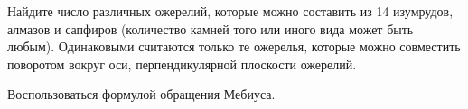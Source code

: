 \begin{comment}
\begin{problem}[``сто заключенных'']
В коридоре находятся 100 человек, у каждого свой номер (от 1 до 100). Их по одному заводят в комнату, в которой 
находится комод со 100 выдвижными ящиками. В ящики случайным образом 
разложены карточки с номерами (от 1 до 100). Каждому разрешается заглянуть в 
не более чем 50 ящиков. Цель каждого -- определить, в каком ящике находится 
его номер. Общаться и передавать друг другу информацию запрещается. 
Предложите стратегию, которая с вероятностью не меньшей $0.3$ (в 
предположении, что все $100!$ способов распределения карточек по ящикам 
равновероятны) приведет к выигрышу всей команды. Команда выигрывает, если 
все 100 участников верно определили ящик с карточкой своего номера.
\end{problem}

\textbf{Стратегия. }Каждый человек первым открывает ящик под его номером, 
вторым -- под номером, который указан на карточке, лежащей в ящике, открытом 
перед этим и т.д. Среднее число циклов длины r в случайной 
перестановке -- есть 1/r (покажите, используя, например, задачу ``про 
предельные меры''). Тогда среднее число циклов длины большей n/2 
есть $\sum\limits_{i=n \mathord{\left/ {\vphantom {n 2}} \right. 
\kern-\nulldelimiterspace} 2}^n {\frac{1}{i}} $. Это и есть вероятность 
существования цикла длины большей n/2. Поэтому вероятность успеха команды -- 
есть $1-\sum\limits_{i=51}^{100} {\frac{1}{i}} \approx 0,31$. Если 
же просто произвольно открывать ящики, то вероятность успеха будет 
$2^{-100}\approx 8\cdot 10^{-31}$. В случае, когда карточки 
разложены не случайным образом, то следует сделать случайной нумерацию 
ящиков, и далее следовать старой стратегии.
\end{comment}

\begin{problem}
Найдите число различных ожерелий, которые можно 
составить из 14 изумрудов, алмазов и сапфиров (количество камней того или 
иного вида может быть любым). Одинаковыми считаются только те ожерелья, которые можно совместить  поворотом вокруг оси, перпендикулярной плоскости ожерелий.

\begin{ordre}
Воспользоваться формулой обращения Мебиуса.
\end{ordre}
   
\end{problem} 